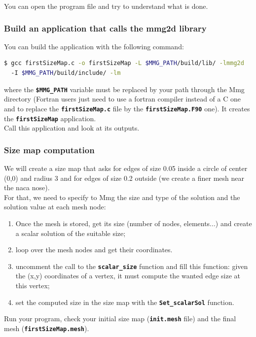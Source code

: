 \documentclass{article}
\newcommand{\ttb}[1]{\texttt{\textbf{#1}}}
\begin{document}
You can open the program file and try to understand what is done.

\subsubsection{Build an application that calls the mmg2d library}
You can build the application with the following command:
\begin{lstlisting}[language=bash]
$ gcc firstSizeMap.c -o firstSizeMap -L $MMG_PATH/build/lib/ -lmmg2d
  -I $MMG_PATH/build/include/ -lm
\end{lstlisting}
where the \ttb{\$MMG\_PATH} variable must be replaced by your path
through the Mmg directory (Fortran users just need to use a fortran compiler
instead of a C one and to replace the \ttb{firstSizeMap.c} file by the
\ttb{firstSizeMap.F90} one). It creates the \ttb{firstSizeMap} application.\\

Call this application and look at its outputs.

\subsubsection{Size map computation}
We will create a size map that asks for edges of size 0.05 inside a
circle of center (0,0) and radius 3 and for edges of size 0.2 outside
(we create a finer mesh near the naca nose).\\ For that, we need to
specify to Mmg the size and type of the solution and
the solution value at each mesh node:
\begin{enumerate}
\item Once the mesh is stored, get its size (number of nodes,
  elements...) and create a scalar solution of the suitable size;
\item loop over the mesh nodes and get their coordinates.
\item uncomment the call to the \ttb{scalar\_size} function and fill
  this function: given the (x,y) coordinates of a vertex, it must
  compute the wanted edge size at this vertex;
\item set the computed size in the size map with the \ttb{Set\_scalarSol} function.\\
\end{enumerate}

 Run your program, check your initial size map (\ttb{init.mesh} file)
 and the final mesh (\ttb{firstSizeMap.mesh}).\\
\end{document}
